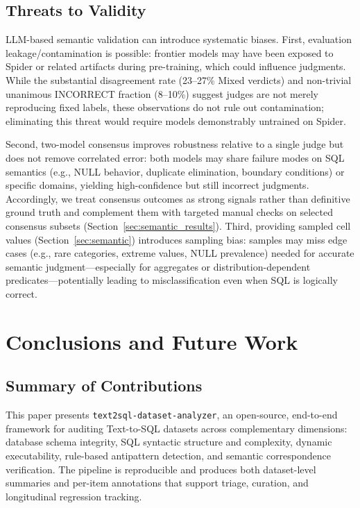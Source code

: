 \documentclass[]{einformatica}
\begin{document}
\subsection{Threats to Validity}

LLM-based semantic validation can introduce systematic biases. First, evaluation leakage/contamination is possible: frontier models may have been exposed to Spider or related artifacts during pre-training, which could influence judgments. While the substantial disagreement rate (23--27\% Mixed verdicts) and non-trivial unanimous INCORRECT fraction (8--10\%) suggest judges are not merely reproducing fixed labels, these observations do not rule out contamination; eliminating this threat would require models demonstrably untrained on Spider.

Second, two-model consensus improves robustness relative to a single judge but does not remove correlated error: both models may share failure modes on SQL semantics (e.g., NULL behavior, duplicate elimination, boundary conditions) or specific domains, yielding high-confidence but still incorrect judgments. Accordingly, we treat consensus outcomes as strong signals rather than definitive ground truth and complement them with targeted manual checks on selected consensus subsets (Section~\ref{sec:semantic_results}). Third, providing sampled cell values (Section~\ref{sec:semantic}) introduces sampling bias: samples may miss edge cases (e.g., rare categories, extreme values, NULL prevalence) needed for accurate semantic judgment---especially for aggregates or distribution-dependent predicates---potentially leading to misclassification even when SQL is logically correct.

\section{Conclusions and Future Work}\label{sec:Conclusions}

\subsection{Summary of Contributions}

This paper presents \texttt{text2sql-dataset-analyzer}, an open-source, end-to-end framework for auditing Text-to-SQL datasets across complementary dimensions: database schema integrity, SQL syntactic structure and complexity, dynamic executability, rule-based antipattern detection, and semantic correspondence verification. The pipeline is reproducible and produces both dataset-level summaries and per-item annotations that support triage, curation, and longitudinal regression tracking.
\end{document}
